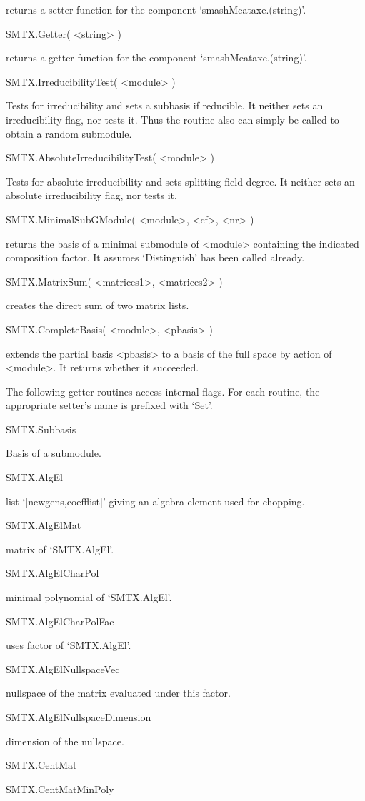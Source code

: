 returns a setter function for the component `smashMeataxe.(string)'.

\>SMTX.Getter( <string> )

returns a getter function for the component `smashMeataxe.(string)'.

\>SMTX.IrreducibilityTest( <module> )

Tests for irreducibility and sets a subbasis if reducible. It neither sets
an irreducibility flag, nor tests it. Thus the routine also can simply be
called to obtain a random submodule.

\>SMTX.AbsoluteIrreducibilityTest( <module> )

Tests for absolute irreducibility and sets splitting field degree. It
neither sets an absolute irreducibility flag, nor tests it.

\>SMTX.MinimalSubGModule( <module>, <cf>, <nr> )

returns the basis of a minimal submodule of <module> containing the
indicated composition factor. It assumes `Distinguish' has been called
already.

\>SMTX.MatrixSum( <matrices1>, <matrices2> )

creates the direct sum of two matrix lists.

\>SMTX.CompleteBasis( <module>, <pbasis> )

extends the partial basis <pbasis> to a basis of the full space
by action of <module>. It returns whether it succeeded.


The following getter routines access internal flags. For each routine, the
appropriate setter's name is prefixed with `Set'.

\>SMTX.Subbasis

Basis of a submodule.

\>SMTX.AlgEl

list `[newgens,coefflist]' giving an algebra element used for chopping.

\>SMTX.AlgElMat

matrix of `SMTX.AlgEl'.

\>SMTX.AlgElCharPol

minimal polynomial of `SMTX.AlgEl'.

\>SMTX.AlgElCharPolFac

uses factor of `SMTX.AlgEl'.

\>SMTX.AlgElNullspaceVec

nullspace of the matrix evaluated under this factor.

\>SMTX.AlgElNullspaceDimension

dimension of the nullspace.

\>SMTX.CentMat


\>SMTX.CentMatMinPoly


